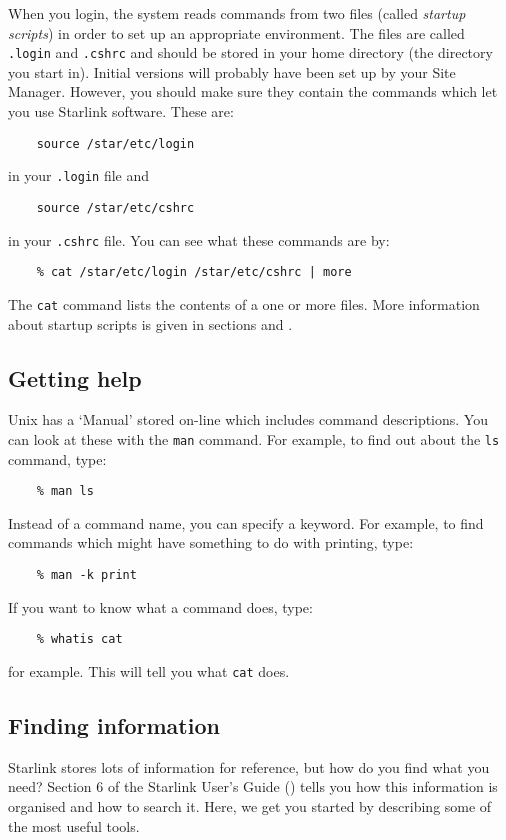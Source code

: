 When you login, the system reads commands from two files (called {\em startup
scripts}) in order to set up an appropriate environment.
The files are called {\tt .login} and {\tt .cshrc} and should be stored in your
home directory (the directory you start in).
Initial versions will probably have been set up by your Site Manager.
However, you should make sure they contain the commands which let you use
Starlink software.
These are:
\begin{verbatim}
    source /star/etc/login
\end{verbatim}
in your {\tt .login} file and
\begin{verbatim}
    source /star/etc/cshrc
\end{verbatim}
in your {\tt .cshrc} file.
You can see what these commands are by:
\begin{verbatim}
    % cat /star/etc/login /star/etc/cshrc | more
\end{verbatim}
The {\tt cat} command lists the contents of a one or more files.
More information about startup scripts is given in sections
 and
.

\subsection{Getting help}

Unix has a `Manual' stored on-line which includes command descriptions.
You can look at these with the {\tt man} command.
For example, to find out about the {\tt ls} command, type:
\begin{verbatim}
    % man ls
\end{verbatim}
Instead of a command name, you can specify a keyword.
For example, to find commands which might have something to do with printing,
type:
\begin{verbatim}
    % man -k print
\end{verbatim}
If you want to know what a command does, type:
\begin{verbatim}
    % whatis cat
\end{verbatim}
for example.
This will tell you what {\tt cat} does.

\subsection{Finding information}

Starlink stores lots of information for reference, but how do you find
what you need?
Section 6 of the Starlink User's Guide 
() tells you how this
information is organised and how to search it.
Here, we get you started by describing some of the most useful tools.

